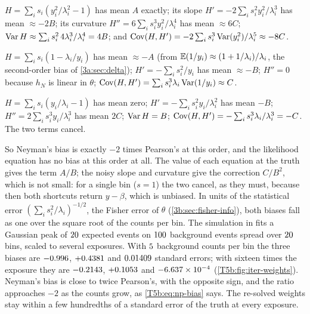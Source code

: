 \begin{explain}
  \item $H=\sum_is_i(y_i^2/\lambda_i^2-1)$ has mean $A$ exactly; its slope
        $H'=-2\sum_is_i^2y_i^2/\lambda_i^3$ has mean $\approx-2B$; its curvature
        $H''=6\sum_is_i^3y_i^2/\lambda_i^4$ has mean $\approx6C$; $\operatorname{Var} H\approx\sum_is_i^2\,4\lambda_i^3/\lambda_i^4=4B$;
        and $\operatorname{Cov}(H,H')=-2\sum_is_i^3\operatorname{Var}(y_i^2)/\lambda_i^5\approx-8C$.
  \item $H=\sum_is_i(1-\lambda_i/y_i)$ has mean $\approx-A$ (from
        $\E(1/y_i)\approx(1+1/\lambda_i)/\lambda_i$, the second-order bias of
        \cref{3a:sec:delta}); $H'=-\sum_is_i^2/y_i$ has mean $\approx-B$; $H''=0$
        because $h_N$ is linear in $\theta$; $\operatorname{Cov}(H,H')=\sum_is_i^3\lambda_i\operatorname{Var}(1/y_i)\approx C$.
  \item $H=\sum_is_i(y_i/\lambda_i-1)$ has mean zero; $H'=-\sum_is_i^2y_i/\lambda_i^2$ has
        mean $-B$; $H''=2\sum_is_i^3y_i/\lambda_i^3$ has mean $2C$; $\operatorname{Var} H=B$;
        $\operatorname{Cov}(H,H')=-\sum_is_i^3\lambda_i/\lambda_i^3=-C$. The two terms cancel.
\end{explain}
So Neyman's bias is exactly $-2$ times Pearson's at this order, and the
likelihood equation has no bias at this order at all. The value of each
equation at the truth gives the term $A/B$; the noisy slope and curvature give
the correction $C/B^2$, which is not small: for a single bin ($s=1$) the two
cancel, as they must, because then both shortcuts return $y-\beta$, which is
unbiased. In units of the statistical error $(\sum_is_i^2/\lambda_i)^{-1/2}$, the Fisher error
of $\theta$ (\cref{3b:sec:fisher-info}), both biases fall as one over the square
root of the counts per bin. The simulation in 
fits a Gaussian peak of $20$ expected events on
$100$ background events spread over $20$ bins, scaled to
several exposures. With $5$ background counts per bin the
three biases are $-0.996$, $+0.4381$ and $0.01409$
standard errors; with sixteen times the exposure they are
$-0.2143$, $+0.1053$ and $-6.637\times10^{-4}$
(\cref{T5b:fig:iter-weights}). Neyman's bias is close to twice Pearson's,
with the opposite sign, and the ratio approaches $-2$ as the counts grow,
as \eqref{T5b:eq:np-bias} says. The re-solved weights stay within a few
hundredths of a standard error of the truth at every exposure.


